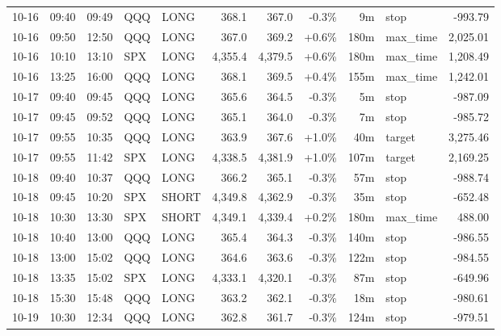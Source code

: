 \documentclass[11pt,a4paper,twoside]{article}
\begin{document}
\begin{center}
\begin{longtable}{>{\color{txtmain}}l l l l l r r r r >{\color{txtmain}}l r}
10-16 & 09:40 & 09:49 & QQQ & LONG & 368.1 & 367.0 & \textcolor{lossred}{-0.3\%} & 9m & stop & \textcolor{lossred}{-993.79} \\
10-16 & 09:50 & 12:50 & QQQ & LONG & 367.0 & 369.2 & \textcolor{wingreen}{+0.6\%} & 180m & max\_time & \textcolor{wingreen}{2,025.01} \\
10-16 & 10:10 & 13:10 & SPX & LONG & 4,355.4 & 4,379.5 & \textcolor{wingreen}{+0.6\%} & 180m & max\_time & \textcolor{wingreen}{1,208.49} \\
10-16 & 13:25 & 16:00 & QQQ & LONG & 368.1 & 369.5 & \textcolor{wingreen}{+0.4\%} & 155m & max\_time & \textcolor{wingreen}{1,242.01} \\
10-17 & 09:40 & 09:45 & QQQ & LONG & 365.6 & 364.5 & \textcolor{lossred}{-0.3\%} & 5m & stop & \textcolor{lossred}{-987.09} \\
10-17 & 09:45 & 09:52 & QQQ & LONG & 365.1 & 364.0 & \textcolor{lossred}{-0.3\%} & 7m & stop & \textcolor{lossred}{-985.72} \\
10-17 & 09:55 & 10:35 & QQQ & LONG & 363.9 & 367.6 & \textcolor{wingreen}{+1.0\%} & 40m & target & \textcolor{wingreen}{3,275.46} \\
10-17 & 09:55 & 11:42 & SPX & LONG & 4,338.5 & 4,381.9 & \textcolor{wingreen}{+1.0\%} & 107m & target & \textcolor{wingreen}{2,169.25} \\
10-18 & 09:40 & 10:37 & QQQ & LONG & 366.2 & 365.1 & \textcolor{lossred}{-0.3\%} & 57m & stop & \textcolor{lossred}{-988.74} \\
10-18 & 09:45 & 10:20 & SPX & SHORT & 4,349.8 & 4,362.9 & \textcolor{lossred}{-0.3\%} & 35m & stop & \textcolor{lossred}{-652.48} \\
10-18 & 10:30 & 13:30 & SPX & SHORT & 4,349.1 & 4,339.4 & \textcolor{wingreen}{+0.2\%} & 180m & max\_time & \textcolor{wingreen}{488.00} \\
10-18 & 10:40 & 13:00 & QQQ & LONG & 365.4 & 364.3 & \textcolor{lossred}{-0.3\%} & 140m & stop & \textcolor{lossred}{-986.55} \\
10-18 & 13:00 & 15:02 & QQQ & LONG & 364.6 & 363.6 & \textcolor{lossred}{-0.3\%} & 122m & stop & \textcolor{lossred}{-984.55} \\
10-18 & 13:35 & 15:02 & SPX & LONG & 4,333.1 & 4,320.1 & \textcolor{lossred}{-0.3\%} & 87m & stop & \textcolor{lossred}{-649.96} \\
10-18 & 15:30 & 15:48 & QQQ & LONG & 363.2 & 362.1 & \textcolor{lossred}{-0.3\%} & 18m & stop & \textcolor{lossred}{-980.61} \\
10-19 & 10:30 & 12:34 & QQQ & LONG & 362.8 & 361.7 & \textcolor{lossred}{-0.3\%} & 124m & stop & \textcolor{lossred}{-979.51} \\

\end{longtable}
\end{center}
\end{document}
